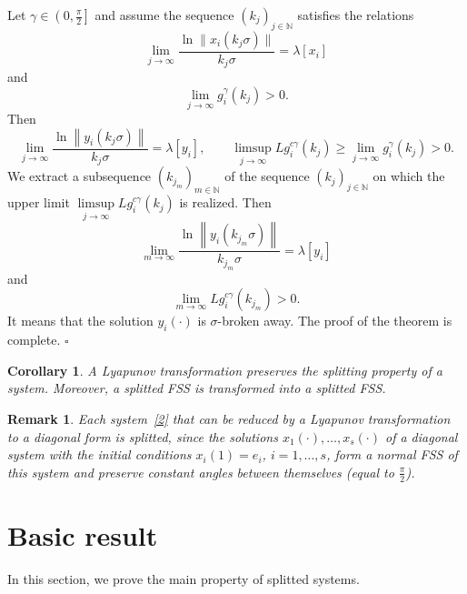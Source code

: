 \documentclass[11pt]{article}
\newtheorem{corollary}[theorem]{Corollary}
\newtheorem{remark}[theorem]{Remark}
\begin{document}
Let $\gamma \in \left( 0,\frac{\pi }{2}\right] $ and 
assume the sequence
$( k_{j})_{j\in \mathbb{N}}$ satisfies the relations 
\begin{equation*}
\lim_{j\to \infty }\frac{\ln \|x_{i}(k_{j}\sigma) \|}{k_{j}\sigma }=\lambda[
x_{i}]
\end{equation*}%
and%
\begin{equation*}
\lim_{j\to\infty }g_{i}^{\gamma }(k_{j})>0.
\end{equation*}%
Then 
\begin{equation*}
\lim_{j\to \infty }\frac{\ln \left\| y_{i}( k_{j}\sigma
) \right\| }{k_{j}\sigma }=\lambda [ y_{i}] ,
\qquad
\limsup_{j\to \infty }Lg_{i}^{c\gamma }(k_{j})\ge
\lim_{j\to \infty }g_{i}^{\gamma }(k_{j})>0.
\end{equation*}%
We extract a subsequence $( k_{j_{m}}) _{m\in \mathbb{N}}$ of the
sequence $( k_{j}) _{j\in \mathbb{N}}$ on which the upper limit
$\limsup\limits_{j\to \infty }Lg_{i}^{c\gamma }(k_{j})$ is realized.
Then%
\begin{equation*}
\lim_{m\to \infty }\frac{\ln \left\| y_{i}( k_{j_{m}}\sigma
) \right\| }{k_{j_{m}}\sigma }=\lambda [ y_{i}] 
\end{equation*}%
and%
\begin{equation*}
\lim_{m\to \infty }Lg_{i}^{c\gamma }(k_{j_{m}})>0.
\end{equation*}%
It means that the solution $y_{i}(\cdot )$ is $\sigma $-broken away. The
proof of the theorem is complete.
\hfill $\square$


\begin{corollary}
\it
A Lyapunov transformation preserves the splitting property of a system.
Moreover, a splitted FSS is transformed into a splitted FSS.
\end{corollary}

\begin{remark}
\label{R1} \textrm{Each system~\eqref{2} that can be reduced by a Lyapunov
transformation to a diagonal form is splitted, since the solutions $x_1(\cdot),\dots,x_s(\cdot)$ 
of a diagonal system with the initial conditions $x_i(1)=e_i$, $i=1,\dots,s$, form a normal FSS of this system and 
preserve constant angles between themselves (equal to $\frac{\pi }{2}$).}
\end{remark}

\section{Basic result} \label{sect5}
In this section, we prove the main property of splitted systems.
\end{document}
